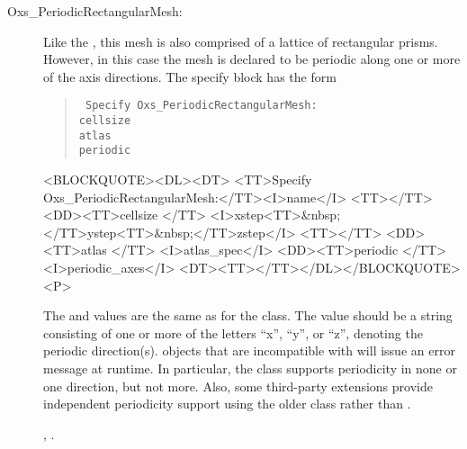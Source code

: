 \begin{description}
\label{html:oxsperiodicrectangularmesh}%
\item[Oxs\_PeriodicRectangularMesh:]
Like the , this mesh is also comprised of a
lattice of rectangular prisms.  However, in this case the
mesh is declared to be periodic along one or more of the axis
directions.  The specify block has the form
\begin{latexonly}
\begin{quote}\tt
Specify Oxs\_PeriodicRectangularMesh: \ocb \\
\bi cellsize \ocb{}\ccb\\
\bi atlas \\
\bi periodic \\
\ccb
\end{quote}
\end{latexonly}
\begin{rawhtml}
<BLOCKQUOTE><DL><DT>
<TT>Specify Oxs_PeriodicRectangularMesh:</TT><I>name</I> <TT>{</TT>
<DD><TT>cellsize {</TT>
  <I>xstep<TT>&nbsp;</TT>ystep<TT>&nbsp;</TT>zstep</I>
  <TT>}</TT>
<DD><TT>atlas </TT> <I>atlas_spec</I>
<DD><TT>periodic </TT> <I>periodic_axes</I>
<DT><TT>}</TT></DL></BLOCKQUOTE><P>
\end{rawhtml}
The  and  values are the same as
for the  class.  The 
value should be a string consisting of one or more of the letters
``x'', ``y'', or ``z'', denoting the periodic direction(s).
 objects that are incompatible with
 will issue an error message at
runtime.  In particular, the
 class supports
periodicity in none or one direction, but not more.  Also, some
third-party extensions provide independent periodicity support using
the older  class rather than
.

\begin{ExampleMifs}
 , .
\end{ExampleMifs}

\end{description}

